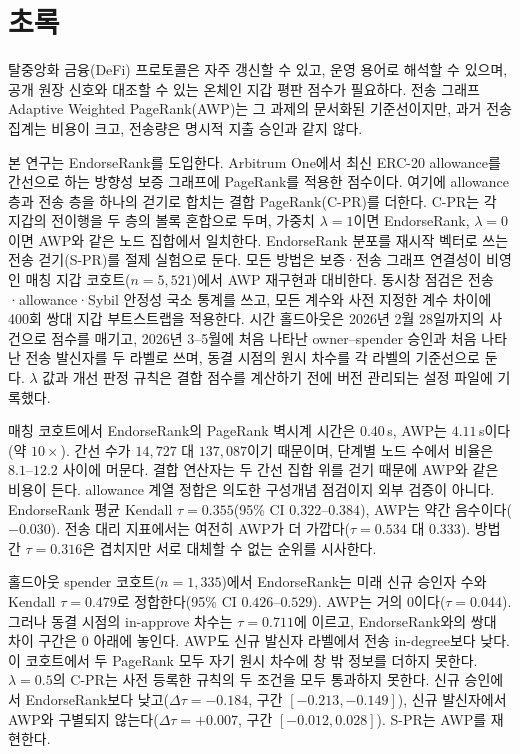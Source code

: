 
\chapter*{초록}

\label{ch:abstract}

탈중앙화 금융(DeFi) 프로토콜은 자주 갱신할 수 있고, 운영 용어로 해석할 수 있으며, 공개 원장 신호와 대조할 수 있는 온체인 지갑 평판 점수가 필요하다. 전송 그래프 Adaptive Weighted PageRank(AWP)는 그 과제의 문서화된 기준선이지만, 과거 전송 집계는 비용이 크고, 전송량은 명시적 지출 승인과 같지 않다.

본 연구는 EndorseRank를 도입한다. Arbitrum One에서 최신 ERC-20 allowance를 간선으로 하는 방향성 보증 그래프에 PageRank를 적용한 점수이다. 여기에 allowance 층과 전송 층을 하나의 걷기로 합치는 결합 PageRank(C-PR)를 더한다. C-PR는 각 지갑의 전이행을 두 층의 볼록 혼합으로 두며, 가중치 $\lambda=1$이면 EndorseRank, $\lambda=0$이면 AWP와 같은 노드 집합에서 일치한다. EndorseRank 분포를 재시작 벡터로 쓰는 전송 걷기(S-PR)를 절제 실험으로 둔다. 모든 방법은 보증·전송 그래프 연결성이 비영인 매칭 지갑 코호트($n=5{,}521$)에서 AWP 재구현과 대비한다. 동시창 점검은 전송·allowance·Sybil 안정성 국소 통계를 쓰고, 모든 계수와 사전 지정한 계수 차이에 400회 쌍대 지갑 부트스트랩을 적용한다. 시간 홀드아웃은 2026년 2월 28일까지의 사건으로 점수를 매기고, 2026년 3--5월에 처음 나타난 owner--spender 승인과 처음 나타난 전송 발신자를 두 라벨로 쓰며, 동결 시점의 원시 차수를 각 라벨의 기준선으로 둔다. $\lambda$ 값과 개선 판정 규칙은 결합 점수를 계산하기 전에 버전 관리되는 설정 파일에 기록했다.

매칭 코호트에서 EndorseRank의 PageRank 벽시계 시간은 $0.40$\,s, AWP는 $4.11$\,s이다(약 $10\times$). 간선 수가 $14{,}727$ 대 $137{,}087$이기 때문이며, 단계별 노드 수에서 비율은 $8.1$--$12.2$ 사이에 머문다. 결합 연산자는 두 간선 집합 위를 걷기 때문에 AWP와 같은 비용이 든다. allowance 계열 정합은 의도한 구성개념 점검이지 외부 검증이 아니다. EndorseRank 평균 Kendall $\tau=0.355$(95\% CI $0.322$--$0.384$), AWP는 약간 음수이다($-0.030$). 전송 대리 지표에서는 여전히 AWP가 더 가깝다($\tau=0.534$ 대 $0.333$). 방법 간 $\tau=0.316$은 겹치지만 서로 대체할 수 없는 순위를 시사한다.

홀드아웃 spender 코호트($n=1{,}335$)에서 EndorseRank는 미래 신규 승인자 수와 Kendall $\tau=0.479$로 정합한다(95\% CI $0.426$--$0.529$). AWP는 거의 0이다($\tau=0.044$). 그러나 동결 시점의 in-approve 차수는 $\tau=0.711$에 이르고, EndorseRank와의 쌍대 차이 구간은 0 아래에 놓인다. AWP도 신규 발신자 라벨에서 전송 in-degree보다 낮다. 이 코호트에서 두 PageRank 모두 자기 원시 차수에 창 밖 정보를 더하지 못한다. $\lambda=0.5$의 C-PR는 사전 등록한 규칙의 두 조건을 모두 통과하지 못한다. 신규 승인에서 EndorseRank보다 낮고($\Delta\tau=-0.184$, 구간 $[-0.213,-0.149]$), 신규 발신자에서 AWP와 구별되지 않는다($\Delta\tau=+0.007$, 구간 $[-0.012,0.028]$). S-PR는 AWP를 재현한다.

